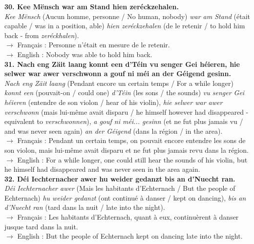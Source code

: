 \textbf{30. Kee Mënsch war am Stand hien zeréckzehalen.}\\
\textit{Kee Mënsch} (Aucun homme, personne / No human, nobody) \textit{war am Stand} (était capable / was in a position, able) \textit{hien zeréckzehalen} (de le retenir / to hold him back - from \textit{zeréckhalen}).\\
$\rightarrow$ Français : Personne n'était en mesure de le retenir.\\
$\rightarrow$ English : Nobody was able to hold him back.\\[0.5em]

\textbf{31. Nach eng Zäit laang konnt een d'Téin vu senger Gei héieren, hie selwer war awer verschwonn a gouf ni méi an der Géigend gesinn.}\\
\textit{Nach eng Zäit laang} (Pendant encore un certain temps / For a while longer) \textit{konnt een} (pouvait-on / could one) \textit{d'Téin} (les sons / the sounds) \textit{vu senger Gei héieren} (entendre de son violon / hear of his violin), \textit{hie selwer war awer verschwonn} (mais lui-même avait disparu / he himself however had disappeared - equivalent to \textit{verschwonnen}), \textit{a gouf ni méi... gesinn} (et ne fut plus jamais vu / and was never seen again) \textit{an der Géigend} (dans la région / in the area).\\
$\rightarrow$ Français : Pendant un certain temps, on pouvait encore entendre les sons de son violon, mais lui-même avait disparu et ne fut plus jamais revu dans la région.\\
$\rightarrow$ English : For a while longer, one could still hear the sounds of his violin, but he himself had disappeared and was never seen in the area again.\\[0.5em]

\textbf{32. Déi Iechternacher awer hu weider gedanzt bis an d'Nuecht ran.}\\
\textit{Déi Iechternacher awer} (Mais les habitants d'Echternach / But the people of Echternach) \textit{hu weider gedanzt} (ont continué à danser / kept on dancing), \textit{bis an d'Nuecht ran} (tard dans la nuit / late into the night).\\
$\rightarrow$ Français : Les habitants d'Echternach, quant à eux, continuèrent à danser jusque tard dans la nuit.\\
$\rightarrow$ English : But the people of Echternach kept on dancing late into the night.\\[0.5em]


